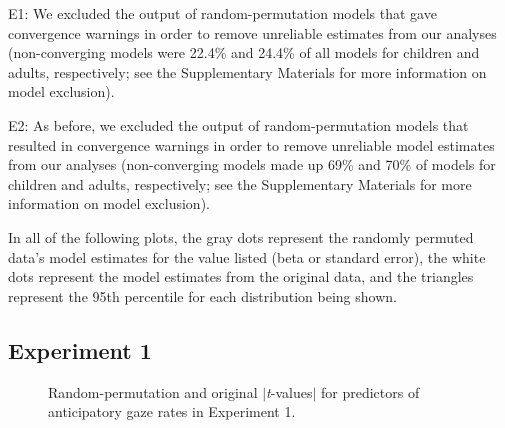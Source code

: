 \documentclass[authoryear, 12pt]{elsarticle}
\begin{document}
E1: We excluded the output of random-permutation models that gave convergence warnings in order to remove unreliable estimates from our analyses (non-converging models were 22.4\% and 24.4\% of all models for children and adults, respectively; see the Supplementary Materials for more information on model exclusion).

E2: As before, we excluded the output of random-permutation models that resulted in convergence warnings in order to remove unreliable model estimates from our analyses (non-converging models made up 69\% and 70\% of models for children and adults, respectively; see the Supplementary Materials for more information on model exclusion).

In all of the following plots, the gray dots represent the randomly permuted data's model estimates for the value listed (beta or standard error), the white dots represent the model estimates from the original data, and the triangles represent the 95th percentile for each distribution being shown.

\subsection{Experiment 1}

\begin{figure}[!htb]
  \centering
  \hfill
  \caption{Random-permutation and original $|$\textit{t}-values$|$ for predictors of anticipatory gaze rates in Experiment 1.}
\end{figure}
\end{document}
